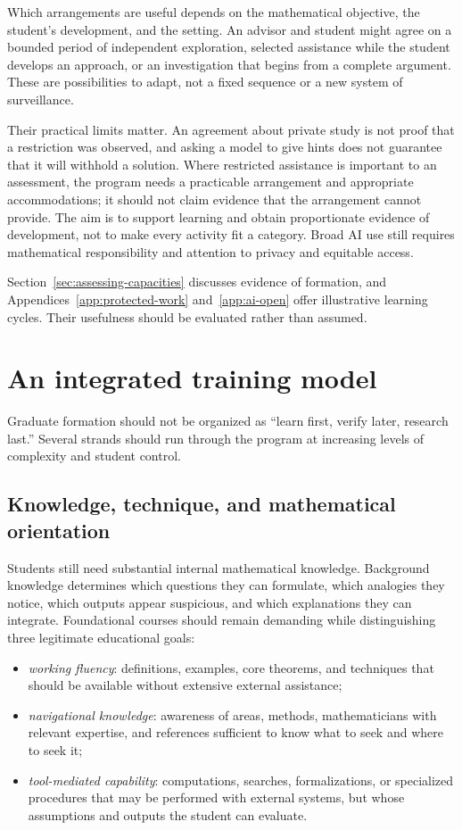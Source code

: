 \documentclass[11pt]{article}
\newcommand{\term}[1]{\emph{#1}}
\begin{document}
Which arrangements are useful depends on the mathematical objective, the student's
development, and the setting. An advisor and student might agree on a bounded period
of independent exploration, selected assistance while the student develops an approach,
or an investigation that begins from a complete argument. These are possibilities to
adapt, not a fixed sequence or a new system of surveillance.

Their practical limits matter. An agreement about private study is not proof that a
restriction was observed, and asking a model to give hints does not guarantee that it
will withhold a solution. Where restricted assistance is important to an assessment,
the program needs a practicable arrangement and appropriate accommodations; it should
not claim evidence that the arrangement cannot provide. The aim is to support learning
and obtain proportionate evidence of development, not to make every activity fit a
category. Broad AI use still requires mathematical responsibility and attention to
privacy and equitable access.

Section~\ref{sec:assessing-capacities} discusses evidence of formation, and
Appendices~\ref{app:protected-work} and~\ref{app:ai-open} offer illustrative learning
cycles. Their usefulness should be evaluated rather than assumed.

\section{An integrated training model}

Graduate formation should not be organized as ``learn first, verify later, research
last.''  Several strands should run through the program at increasing levels of
complexity and student control.

\subsection{Knowledge, technique, and mathematical orientation}

Students still need substantial internal mathematical knowledge.  Background knowledge
determines which questions they can formulate, which analogies they notice, which outputs
appear suspicious, and which explanations they can integrate.  Foundational courses
should remain demanding while distinguishing three legitimate educational goals:

\begin{itemize}
    \item \term{working fluency}: definitions, examples, core theorems, and techniques
    that should be available without extensive external assistance;
    \item \term{navigational knowledge}: awareness of areas, methods, mathematicians with relevant expertise, and
    references sufficient to know what to seek and where to seek it;
    \item \term{tool-mediated capability}: computations, searches, formalizations, or
    specialized procedures that may be performed with external systems, but whose
    assumptions and outputs the student can evaluate.
\end{itemize}
\end{document}
